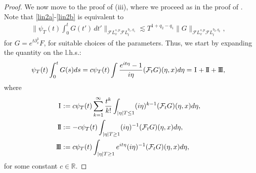\documentclass[%
11pt,  reqno]{amsart}
\newcommand{\I}{\hspace{0.2mm}\textup{I}\hspace{0.2mm}}
\newcommand{\II}{\textup{I \hspace{-2.9mm} I} }
\newcommand{\III}{\textup{I \hspace{-2.9mm} I \hspace{-2.9mm} I}}
\newcommand{\5}{\textup{V}}
\newcommand{\FL}{\mathcal{F} L}
\newcommand{\les}{\lesssim}
\theoremstyle{remark}
\newcommand{\R}{\mathbb{R}}
\numberwithin{equation}{section}
\numberwithin{theorem}{section}
\begin{document}
\begin{proof}
			We now move to the proof of (iii), where we proceed as in the proof of \cite[Lemma~2]{Grunrock_mkdv}.
            Note that \eqref{lin2a}-\eqref{lin2b} is equivalent to 
            \begin{align}
                \bigg\| \psi_T (t) \int_0^t G(t') \, dt' \bigg\|_{\FL^{s, p}_x \FL^{b_1, q_1 }_t }
                \les T^{1+ q_2 - q_1} \| G \|_{\FL^{s, p}_x \FL^{b_2 , q_2}_t }, 
            \end{align}
            for $G = e^{t\partial_x^3} F$, for suitable choices of the parameters. Thus, we start by expanding the quantity on the l.h.s.:
			\begin{equation}
				\psi_T(t)\int_0^t G(s) ds =  c \psi_T (t)\int \frac{e^{it\eta}-1}{i\eta } (\mathcal{F}_t G )(\eta,x) d\eta = \I + \II + \III,
				\label{lin3a}
			\end{equation}
			where
			\begin{equation}
				\label{lin3}
				\begin{aligned}
					\I & :=c\psi_T(t)\sum_{k= 1}^\infty \frac{t^k}{k!}\int_{|\eta| T \le 1} (i\eta)^{k-1} (\mathcal{F}_t G )(\eta,x) d\eta, \\
					\II& :=-c\psi_T (t)\int_{|\eta|T \ge 1} (i\eta)^{-1} (\mathcal{F}_t G )(\eta,x) d\eta , \\
					\III & :=c\psi_T (t)\int_{|\eta| T  \ge 1} e^{it\eta}(i\eta)^{-1} (\mathcal{F}_t G )(\eta,x) d\eta,
				\end{aligned}
			\end{equation}
			for some constant $c\in\R$.
            

\end{proof}
\end{document}
